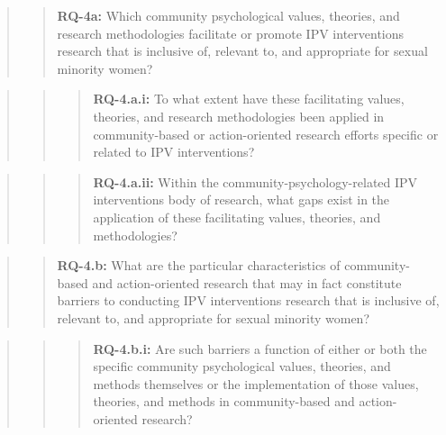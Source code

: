 \documentclass[11pt,]{tufte-book}
\newcommand{\rowgroup}[2][-1em]{\hspace{#1}#2}
\begin{document}
\begin{quote}
\begin{quote}
\rowgroup[-3em]{\textbf{RQ-4a:} Which community psychological values, theories, and research methodologies facilitate or promote IPV interventions research that is inclusive of, relevant to, and appropriate for sexual minority women?}
\end{quote}
\end{quote}

\begin{quote}
\begin{quote}
\begin{quote}
\rowgroup[-3em]{\textbf{RQ-4.a.i:} To what extent have these facilitating values, theories, and research methodologies been applied in community-based or action-oriented research efforts specific or related to IPV interventions?}
\end{quote}
\end{quote}
\end{quote}

\begin{quote}
\begin{quote}
\begin{quote}
\rowgroup[-3em]{\textbf{RQ-4.a.ii:} Within the community-psychology-related IPV interventions body of research, what gaps exist in the application of these facilitating values, theories, and methodologies?}
\end{quote}
\end{quote}
\end{quote}

\begin{quote}
\begin{quote}
\rowgroup[-3em]{\textbf{RQ-4.b:} What are the particular characteristics of community-based and action-oriented research that may in fact constitute barriers to conducting IPV interventions research that is inclusive of, relevant to, and appropriate for sexual minority women?}
\end{quote}
\end{quote}

\begin{quote}
\begin{quote}
\begin{quote}
\rowgroup[-3em]{\textbf{RQ-4.b.i:} Are such barriers a function of either or both the specific community psychological values, theories, and methods themselves or the implementation of those values, theories, and methods in community-based and action-oriented research?}
\end{quote}
\end{quote}
\end{quote}
\end{document}
